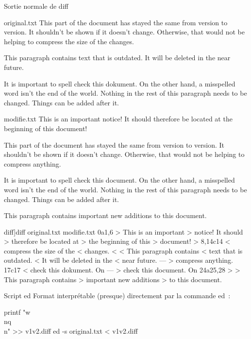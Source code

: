 \begin{frame}[fragile]{Sortie normale de diff}
  \begin{tcbraster}[raster columns=3, raster valign=top]
  \begin{snvlisting}{original.txt}
This part of the
document has stayed the
same from version to
version.  It shouldn't
be shown if it doesn't
change.  Otherwise, that
would not be helping to
compress the size of the
changes.

This paragraph contains
text that is outdated.
It will be deleted in the
near future.

It is important to spell
check this dokument. On
the other hand, a
misspelled word isn't
the end of the world.
Nothing in the rest of
this paragraph needs to
be changed. Things can
be added after it.
  \end{snvlisting}
  \begin{snvlisting}{modifie.txt}
This is an important
notice! It should
therefore be located at
the beginning of this
document!

This part of the
document has stayed the
same from version to
version.  It shouldn't
be shown if it doesn't
change.  Otherwise, that
would not be helping to
compress anything.

It is important to spell
check this document. On
the other hand, a
misspelled word isn't
the end of the world.
Nothing in the rest of
this paragraph needs to
be changed. Things can
be added after it.

This paragraph contains
important new additions
to this document.
  \end{snvlisting}
  \begin{snvlisting}[[normal]diff]{diff original.txt modifie.txt}
0a1,6
> This is an important
> notice! It should
> therefore be located at
> the beginning of this
> document!
>
8,14c14
< compress the size of the
< changes.
<
< This paragraph contains
< text that is outdated.
< It will be deleted in the
< near future.
---
> compress anything.
17c17
< check this dokument. On
---
> check this document. On
24a25,28
>
> This paragraph contains
> important new additions
> to this document.
\end{snvlisting}
\end{tcbraster}
\end{frame}

\begin{frame}[fragile]{Script ed}
Format interprétable (presque) directement par la commande ed~:
\begin{shell}
printf "w\\nq\\n" >> v1v2.diff
ed -s original.txt < v1v2.diff
\end{shell}

\end{frame}

